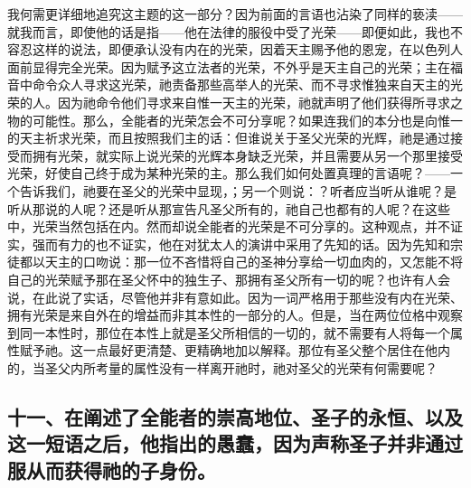 我何需更详细地追究这主题的这一部分？因为前面的言语也沾染了同样的亵渎——就我而言，即使他的话是指——他在法律的服役中受了光荣——即便如此，我也不容忍这样的说法，即便承认没有内在的光荣，因着天主赐予他的恩宠，在以色列人面前显得完全光荣。因为赋予这立法者的光荣，不外乎是天主自己的光荣；主在福音中命令众人寻求这光荣，祂责备那些高举人的光荣、而不寻求惟独来自天主的光荣的人。因为祂命令他们寻求来自惟一天主的光荣，祂就声明了他们获得所寻求之物的可能性。那么，全能者的光荣怎会不可分享呢？如果连我们的本分也是向惟一的天主祈求光荣，而且按照我们主的话：但谁说关于圣父光荣的光辉，祂是通过接受而拥有光荣，就实际上说光荣的光辉本身缺乏光荣，并且需要从另一个那里接受光荣，好使自己终于成为某种光荣的主。那么我们如何处置真理的言语呢？——一个告诉我们，祂要在圣父的光荣中显现，；另一个则说：？听者应当听从谁呢？是听从那说的人呢？还是听从那宣告凡圣父所有的，祂自己也都有的人呢？在这些中，光荣当然包括在内。然而却说全能者的光荣是不可分享的。这种观点，并不证实，强而有力的也不证实，他在对犹太人的演讲中采用了先知的话。因为先知和宗徒都以天主的口吻说：那一位不吝惜将自己的圣神分享给一切血肉的，又怎能不将自己的光荣赋予那在圣父怀中的独生子、那拥有圣父所有一切的呢？也许有人会说，在此说了实话，尽管他并非有意如此。因为一词严格用于那些没有内在光荣、拥有光荣是来自外在的增益而非其本性的一部分的人。但是，当在两位位格中观察到同一本性时，那位在本性上就是圣父所相信的一切的，就不需要有人将每一个属性赋予祂。这一点最好更清楚、更精确地加以解释。那位有圣父整个居住在他内的，当圣父内所考量的属性没有一样离开祂时，祂对圣父的光荣有何需要呢？\par


\subsection{十一、在阐述了全能者的崇高地位、圣子的永恒、以及这一短语之后，他指出的愚蠢，因为声称圣子并非通过服从而获得祂的子身份。}

